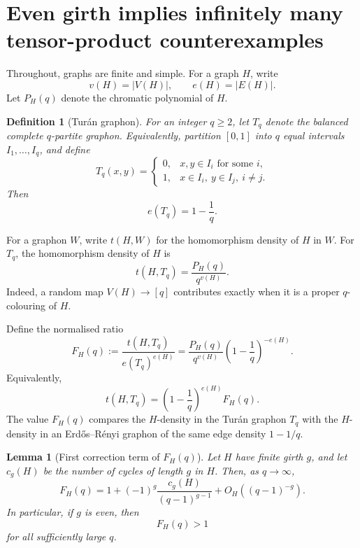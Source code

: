 \documentclass[11pt]{article}
\newtheorem{lemma}{Lemma}
\newtheorem{definition}{Definition}
\begin{document}
\section*{Even girth implies infinitely many tensor-product counterexamples}

Throughout, graphs are finite and simple.  For a graph \(H\), write
\[
    v(H)=|V(H)|,\qquad e(H)=|E(H)|.
\]
Let \(P_H(q)\) denote the chromatic polynomial of \(H\).

\begin{definition}[Turán graphon]
For an integer \(q\geq 2\), let \(T_q\) denote the balanced complete
\(q\)-partite graphon.  Equivalently, partition \([0,1]\) into \(q\)
equal intervals \(I_1,\dots,I_q\), and define
\[
    T_q(x,y)=
    \begin{cases}
        0, & x,y\in I_i \text{ for some } i,\\
        1, & x\in I_i,\ y\in I_j,\ i\neq j.
    \end{cases}
\]
Then
\[
    e(T_q)=1-\frac1q.
\]
\end{definition}

For a graphon \(W\), write \(t(H,W)\) for the homomorphism density of
\(H\) in \(W\).  For \(T_q\), the homomorphism density of \(H\) is
\[
    t(H,T_q)=\frac{P_H(q)}{q^{v(H)}}.
\]
Indeed, a random map \(V(H)\to [q]\) contributes exactly when it is a
proper \(q\)-colouring of \(H\).

Define the normalised ratio
\[
    F_H(q)
    :=
    \frac{t(H,T_q)}{e(T_q)^{e(H)}}
    =
    \frac{P_H(q)}{q^{v(H)}}
    \left(1-\frac1q\right)^{-e(H)}.
\]
Equivalently,
\[
    t(H,T_q)
    =
    \left(1-\frac1q\right)^{e(H)} F_H(q).
\]
The value \(F_H(q)\) compares the \(H\)-density in the Turán graphon
\(T_q\) with the \(H\)-density in an Erdős--Rényi graphon of the same
edge density \(1-1/q\).

\begin{lemma}[First correction term of \(F_H(q)\)]
Let \(H\) have finite girth \(g\), and let \(c_g(H)\) be the number of
cycles of length \(g\) in \(H\).  Then, as \(q\to\infty\),
\[
    F_H(q)
    =
    1
    +
    (-1)^g \frac{c_g(H)}{(q-1)^{g-1}}
    +
    O_H\!\left((q-1)^{-g}\right).
\]
In particular, if \(g\) is even, then
\[
    F_H(q)>1
\]
for all sufficiently large \(q\).
\end{lemma}
\end{document}
